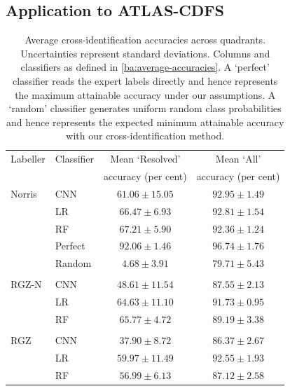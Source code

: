 \documentclass[fleqn,usenatbib,usedcolumn]{mnras}
\begin{document}
\subsection{Application to ATLAS-CDFS}
\begin{table}
    \caption{Average cross-identification accuracies across quadrants.
      Uncertainties represent standard deviations. Columns and classifiers as defined in \autoref{ba:average-accuracies}.  A `perfect' classifier reads the
      expert labels directly and hence represents the maximum attainable
      accuracy under our assumptions. A `random' classifier generates uniform
      random class probabilities and hence represents the expected minimum
      attainable accuracy with our cross-identification method.}    
      \label{tab:cross-id-accuracies}
\begin{tabular}{llcc}
\hline
Labeller & Classifier  & Mean `Resolved' & Mean `All' \\
 & & accuracy (per cent) & accuracy (per cent)\\
\hline
Norris & CNN & $61.06 \pm 15.05$ & $92.95 \pm 1.49$\\
 & LR & $66.47 \pm 6.93$ & $92.81 \pm 1.54$\\
 & RF & $67.21 \pm 5.90$ & $92.36 \pm 1.24$\\
 & Perfect & $92.06 \pm 1.46$ & $96.74 \pm 1.76$\\
 & Random & $4.68 \pm 3.91$ & $79.71 \pm 5.43$\\
 \\
RGZ-N & CNN & $48.61 \pm 11.54$ & $87.55 \pm 2.13$\\
 & LR & $64.63 \pm 11.10$ & $91.73 \pm 0.95$\\
 & RF & $65.77 \pm 4.72$ & $89.19 \pm 3.38$\\
 \\
RGZ & CNN & $37.90 \pm 8.72$ & $86.37 \pm 2.67$\\
 & LR & $59.97 \pm 11.49$ & $92.55 \pm 1.93$\\
 & RF & $56.99 \pm 6.13$ & $87.12 \pm 2.58$\\
 \hline
\end{tabular}
\end{table}
\end{document}
